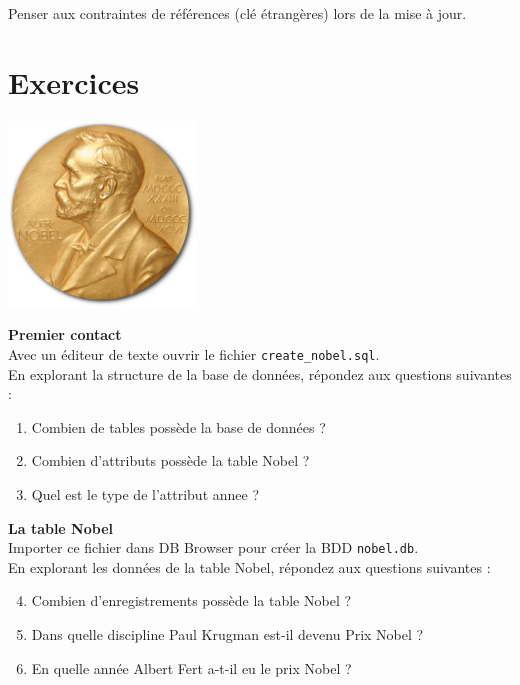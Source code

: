 \documentclass[10pt,cours,a4paper,firamath]{nsi}
\begin{document}
Penser aux contraintes de références (clé étrangères) lors de la mise à jour.
\section{Exercices}

\begin{exercice}
    \begin{center}
        \includegraphics[width=5cm]{img/nobel}
    \end{center}
    \textbf{Premier contact}\\
    
    Avec un éditeur de texte ouvrir le fichier \texttt{create\_nobel.sql}.\\
    En explorant la structure de la base de données, répondez aux questions suivantes :	\\
    \begin{enumerate}
        \item 	Combien de tables possède la base de données ?
        \item 	Combien d'attributs possède la table Nobel ?
        \item 	Quel est le type de l'attribut annee ?\\
    \end{enumerate}
    \textbf{La table Nobel}\\
    
    Importer ce fichier dans DB Browser pour créer la BDD \texttt{nobel.db}.\\
    En explorant les données de la table Nobel, répondez aux questions suivantes :\\
    
    \begin{enumerate}
        \setcounter{enumi}{3}
        \item 	Combien d'enregistrements possède la table Nobel ?
        \item 	Dans quelle discipline Paul Krugman est-il devenu Prix Nobel ?
        \item 	En quelle année Albert Fert a-t-il eu le prix Nobel ?	\\
    \end{enumerate}
    

\end{exercice}
\end{document}
